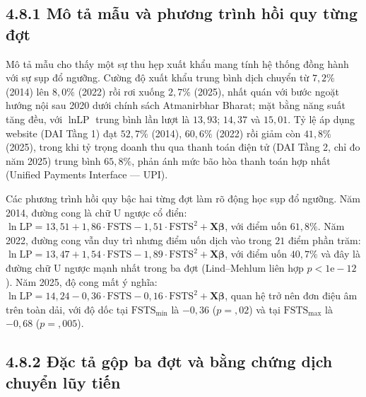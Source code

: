 \documentclass[
  a4paper,
  13pt]{extreport}
\begin{document}
\hypertarget{muxf4-tux1ea3-mux1eabu-vuxe0-phux1b0ux1a1ng-truxecnh-hux1ed3i-quy-tux1eebng-ux111ux1ee3t}{%
\subsection{4.8.1 Mô tả mẫu và phương trình hồi quy từng
đợt}\label{muxf4-tux1ea3-mux1eabu-vuxe0-phux1b0ux1a1ng-truxecnh-hux1ed3i-quy-tux1eebng-ux111ux1ee3t}}

Mô tả mẫu cho thấy một sự thu hẹp xuất khẩu mang tính hệ thống đồng hành
với sự sụp đổ ngưỡng. Cường độ xuất khẩu trung bình dịch chuyển từ
\(7{,}2\%\) (2014) lên \(8{,}0\%\) (2022) rồi rơi xuống \(2{,}7\%\)
(2025), nhất quán với bước ngoặt hướng nội sau 2020 dưới chính sách
Atmanirbhar Bharat; mặt bằng năng suất tăng đều, với \(\ln\text{LP}\)
trung bình lần lượt là \(13{,}93\); \(14{,}37\) và \(15{,}01\). Tỷ lệ áp
dụng website (DAI Tầng 1) đạt \(52{,}7\%\) (2014), \(60{,}6\%\) (2022)
rồi giảm còn \(41{,}8\%\) (2025), trong khi tỷ trọng doanh thu qua thanh
toán điện tử (DAI Tầng 2, chỉ đo năm 2025) trung bình \(65{,}8\%\), phản
ánh mức bão hòa thanh toán hợp nhất (Unified Payments Interface ---
UPI).

Các phương trình hồi quy bậc hai từng đợt làm rõ động học sụp đổ ngưỡng.
Năm 2014, đường cong là chữ U ngược cổ điển:
\(\ln\text{LP} = 13{,}51 + 1{,}86 \cdot \text{FSTS} - 1{,}51 \cdot \text{FSTS}^2 + \mathbf{X}\boldsymbol{\beta}\),
với điểm uốn \(61{,}8\%\). Năm 2022, đường cong vẫn duy trì nhưng điểm
uốn dịch vào trong \(21\) điểm phần trăm:
\(\ln\text{LP} = 13{,}47 + 1{,}54 \cdot \text{FSTS} - 1{,}89 \cdot \text{FSTS}^2 + \mathbf{X}\boldsymbol{\beta}\),
với điểm uốn \(40{,}7\%\) và đây là đường chữ U ngược mạnh nhất trong ba
đợt (Lind--Mehlum liên hợp \(p < 1\mathrm{e}{-}12\)). Năm 2025, độ cong
mất ý nghĩa:
\(\ln\text{LP} = 14{,}24 - 0{,}36 \cdot \text{FSTS} - 0{,}16 \cdot \text{FSTS}^2 + \mathbf{X}\boldsymbol{\beta}\),
quan hệ trở nên đơn điệu âm trên toàn dải, với độ dốc tại
\(\text{FSTS}_{\min}\) là \(-0{,}36\) (\(p = {,}02\)) và tại
\(\text{FSTS}_{\max}\) là \(-0{,}68\) (\(p = {,}005\)).

\hypertarget{ux111ux1eb7c-tux1ea3-gux1ed9p-ba-ux111ux1ee3t-vuxe0-bux1eb1ng-chux1ee9ng-dux1ecbch-chuyux1ec3n-lux169y-tiux1ebfn}{%
\subsection{4.8.2 Đặc tả gộp ba đợt và bằng chứng dịch chuyển lũy
tiến}\label{ux111ux1eb7c-tux1ea3-gux1ed9p-ba-ux111ux1ee3t-vuxe0-bux1eb1ng-chux1ee9ng-dux1ecbch-chuyux1ec3n-lux169y-tiux1ebfn}}
\end{document}
